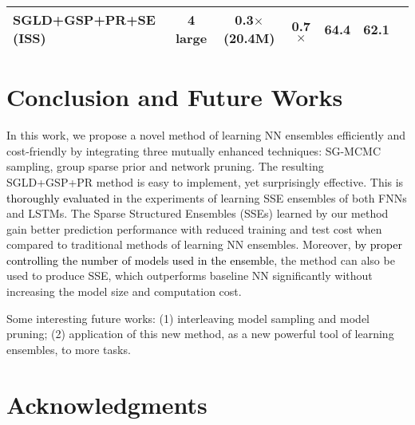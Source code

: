 \documentclass{article} %
\newcommand{\ozj}{\textcolor{black}}
\begin{document}
\begin{table}[t]
\begin{center}
\begin{tabular}{lcccccc}
			
			SGLD+GSP+PR+SE (ISS) &4 large &\bf0.3$\times$ (20.4M) &\bf0.7 $\times$ &\bf64.4 &\bf62.1\\
			\bottomrule
		\end{tabular}
	\end{center}
\end{table}





\section{Conclusion and Future Works}
In this work, we propose a novel method of learning NN ensembles efficiently and cost-friendly by integrating three mutually enhanced techniques: SG-MCMC sampling, group sparse prior and network pruning. 
The resulting SGLD+GSP+PR method is easy to implement, yet surprisingly effective.
This is \ozj{thoroughly evaluated} in the experiments of learning SSE ensembles of both FNNs and LSTMs.
The Sparse Structured Ensembles (SSEs) learned by our method gain better prediction performance with reduced training and test cost when compared to traditional methods of learning NN ensembles. Moreover, \ozj{by proper controlling the number of models used in the ensemble}, the method can also be used to produce SSE, which outperforms baseline NN significantly without increasing the model size and computation cost.

Some interesting future works: (1) interleaving model sampling and model pruning; (2) application of this new method, as a new powerful tool of learning ensembles, to more tasks.

\section*{Acknowledgments}





\end{document}
